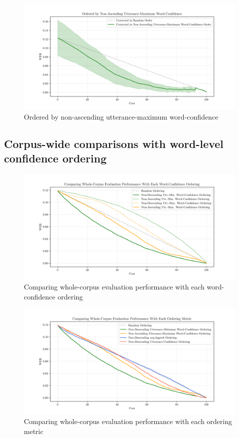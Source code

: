 \begin{figure}[p]
 \caption{Ordered by non-ascending utterance-maximum word-confidence}
 \label{fig:word-conf-comparison-plot4}
 \includegraphics[width=\textwidth]{figures/word-conf-comparison-plot4.png}
 \centering
\end{figure}

\clearpage
\subsection{Corpus-wide comparisons with word-level confidence ordering}

\begin{figure}[h!]
 \caption{Comparing whole-corpus evaluation performance with each word-confidence ordering}
 \label{fig:corpus-all-word-conf-measures}
 \includegraphics[width=\textwidth]{figures/corpus-all-word-conf-measures.png}
 \centering
\end{figure}
\begin{figure}[h!]
 \caption{Comparing whole-corpus evaluation performance with each ordering metric}
 \label{fig:corpus-allmeasures}
 \includegraphics[width=\textwidth]{figures/corpus-allmeasures.png}
 \centering
\end{figure}
